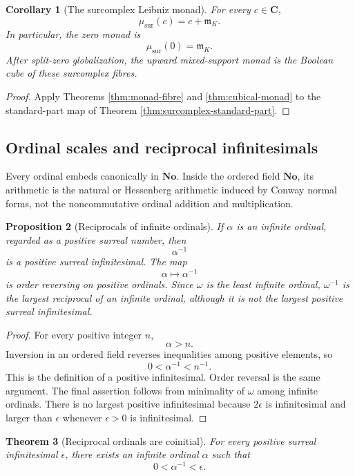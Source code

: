 \documentclass[11pt]{amsart}
\numberwithin{equation}{section}
\newtheorem{theorem}{Theorem}[section]
\newtheorem{proposition}[theorem]{Proposition}
\newtheorem{corollary}[theorem]{Corollary}
\theoremstyle{definition}
\newcommand{\C}{\mathbf C}
\newcommand{\No}{\mathbf{No}}
\begin{document}
\begin{corollary}[The surcomplex Leibniz monad]\label{cor:surcomplex-monad}
For every $c\in\C$,
\[
\mu_{\mathrm{sur}}(c)
=
c+\mathfrak m_K.
\]
In particular, the zero monad is
\[
\mu_{\mathrm{sur}}(0)=\mathfrak m_K.
\]
After split-zero globalization, the upward mixed-support monad is the Boolean cube of these surcomplex fibres.
\end{corollary}

\begin{proof}
Apply Theorems \ref{thm:monad-fibre} and \ref{thm:cubical-monad} to the standard-part map of Theorem \ref{thm:surcomplex-standard-part}.
\end{proof}

\subsection{Ordinal scales and reciprocal infinitesimals}

Every ordinal embeds canonically in $\No$.  Inside the ordered field $\No$, its arithmetic is the natural or Hessenberg arithmetic induced by Conway normal forms, not the noncommutative ordinal addition and multiplication.

\begin{proposition}[Reciprocals of infinite ordinals]\label{prop:ordinal-reciprocals}
If $\alpha$ is an infinite ordinal, regarded as a positive surreal number, then
\[
\alpha^{-1}
\]
is a positive surreal infinitesimal.  The map
\[
\alpha\longmapsto\alpha^{-1}
\]
is order reversing on positive ordinals.  Since $\omega$ is the least infinite ordinal, $\omega^{-1}$ is the largest reciprocal of an infinite ordinal, although it is not the largest positive surreal infinitesimal.
\end{proposition}

\begin{proof}
For every positive integer $n$,
\[
\alpha>n.
\]
Inversion in an ordered field reverses inequalities among positive elements, so
\[
0<\alpha^{-1}<n^{-1}.
\]
This is the definition of a positive infinitesimal.  Order reversal is the same argument.  The final assertion follows from minimality of $\omega$ among infinite ordinals.  There is no largest positive infinitesimal because $2\epsilon$ is infinitesimal and larger than $\epsilon$ whenever $\epsilon>0$ is infinitesimal.
\end{proof}

\begin{theorem}[Reciprocal ordinals are coinitial]\label{thm:reciprocal-coinitial}
For every positive surreal infinitesimal $\epsilon$, there exists an infinite ordinal $\alpha$ such that
\[
0<\alpha^{-1}<\epsilon.
\]
\end{theorem}
\end{document}
